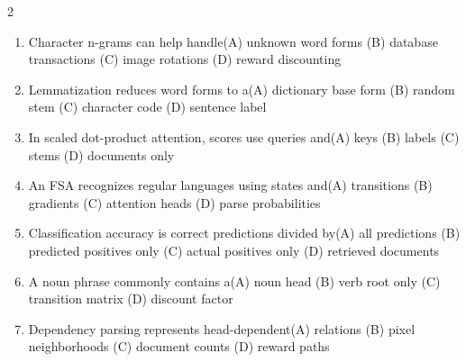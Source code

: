 \documentclass[a4paper]{article}
\begin{document}
\begin{multicols*}{2}
\begin{enumerate}[resume]
\item Character n-grams can help handle\newline\hspace*{0.6em}(A) unknown word forms \quad (B) database transactions \newline\hspace*{0.6em}(C) image rotations \quad (D) reward discounting
\item Lemmatization reduces word forms to a\newline\hspace*{0.6em}(A) dictionary base form \quad (B) random stem \newline\hspace*{0.6em}(C) character code \quad (D) sentence label
\item In scaled dot-product attention, scores use queries and\newline\hspace*{0.6em}(A) keys \quad (B) labels \newline\hspace*{0.6em}(C) stems \quad (D) documents only
\item An FSA recognizes regular languages using states and\newline\hspace*{0.6em}(A) transitions \quad (B) gradients \newline\hspace*{0.6em}(C) attention heads \quad (D) parse probabilities
\item Classification accuracy is correct predictions divided by\newline\hspace*{0.6em}(A) all predictions \quad (B) predicted positives only \newline\hspace*{0.6em}(C) actual positives only \quad (D) retrieved documents
\item A noun phrase commonly contains a\newline\hspace*{0.6em}(A) noun head \quad (B) verb root only \newline\hspace*{0.6em}(C) transition matrix \quad (D) discount factor
\item Dependency parsing represents head-dependent\newline\hspace*{0.6em}(A) relations \quad (B) pixel neighborhoods \newline\hspace*{0.6em}(C) document counts \quad (D) reward paths

\end{enumerate}
\end{multicols*}
\end{document}
